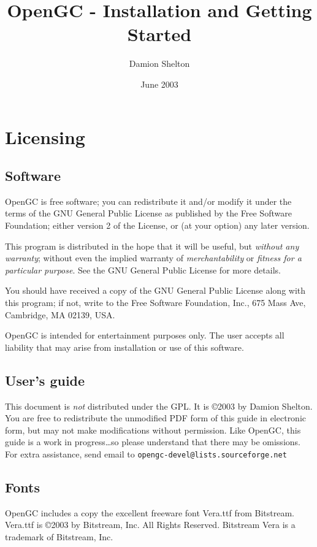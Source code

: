 \documentclass[11pt]{article}
\begin{document}
\title{OpenGC - Installation and Getting Started}
\author{Damion Shelton}
\date{June 2003}
\maketitle

\section{Licensing}
\subsection{Software}
OpenGC is free software; you can redistribute it and/or modify it under the terms of the GNU General Public License as published by the Free Software Foundation; either version 2 of the License, or (at your option) any later version.

This program is distributed in the hope that it will be useful, but \emph{without any warranty}; without even the implied warranty of \emph{merchantability} or \emph{fitness for a particular purpose}. See the GNU General Public License for more details.

You should have received a copy of the GNU General Public License along with this program; if not, write to the Free Software Foundation, Inc., 675 Mass Ave, Cambridge, MA 02139, USA.
  
OpenGC is intended for entertainment purposes only. The user accepts all liability that may arise from installation or use of this software.

\subsection{User's guide}
This document is \emph{not} distributed under the GPL. It is \copyright 2003 by Damion Shelton. You are free to redistribute the unmodified PDF form of this guide in electronic form, but may not make modifications without permission. Like OpenGC, this guide is a work in progress\dots so please understand that there may be omissions. For extra assistance, send email to \texttt{opengc-devel@lists.sourceforge.net}

\subsection{Fonts}
OpenGC includes a copy the excellent freeware font Vera.ttf from Bitstream. Vera.ttf is \copyright 2003 by Bitstream, Inc. All Rights Reserved. Bitstream Vera is a trademark of Bitstream, Inc.
\end{document}
